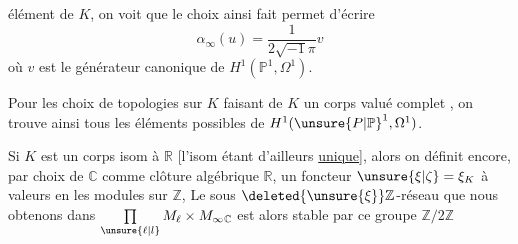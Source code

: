 élément de $K$, on voit que le choix ainsi fait permet d'écrire
\[
 \alpha_\infty(u)=\frac{1}{2\sqrt{-1}\pi}v
\]
où $v$ est le générateur canonique de $H^1(\mathbb P^1,\Omega^1)$.

Pour les choix  de topologies sur $K$ faisant de $K$ un corps valué complet , on trouve ainsi tous les éléments possibles de $H^1(\unsure{P|\mathbb P}^1,\Omega^1)$.

Si $K$ est un corps  isom à $\mathbb R$ [l'isom étant d'ailleurs \uline{unique}], alors on définit encore, par choix de $\mathbb C$ comme  clôture algébrique  $\mathbb R$, un foncteur $\unsure{\xi|\zeta}=\xi_K$ à valeurs en les modules sur $\mathbb Z$,   Le sous $\deleted{\unsure{\xi}}\mathbb Z$-réseau  que nous obtenons dans $\prod\limits_{\unsure{\ell|l}} M_\ell\times M_\infty{}_{\mathbb C}$  est alors stable par ce groupe $\mathbb Z/2\mathbb Z$

